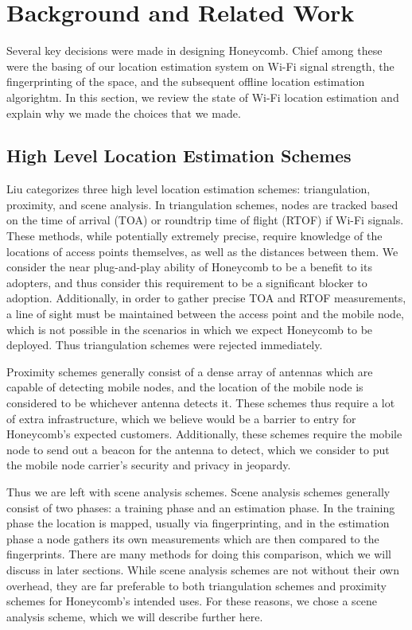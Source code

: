 \chapter{Background and Related Work}
\label{related}
%

Several key decisions were made in designing Honeycomb. Chief among these were the basing of our location estimation system on Wi-Fi signal strength, the fingerprinting of the space, and the subsequent offline location estimation algorightm. In this section, we review the state of Wi-Fi location estimation and explain why we made the choices that we made. 

\section{High Level Location Estimation Schemes}
%

Liu \cite{liu2007survey} categorizes three high level location estimation schemes: triangulation, proximity, and scene analysis. In triangulation schemes, nodes are tracked based on the time of arrival (TOA) or roundtrip time of flight (RTOF) if Wi-Fi signals. These methods, while potentially extremely precise, require knowledge of the locations of access points themselves, as well as the distances between them. We consider the near plug-and-play ability of Honeycomb to be a benefit to its adopters, and thus consider this requirement to be a significant blocker to adoption.  Additionally, in order to gather precise TOA and RTOF measurements, a line of sight must be maintained between the access point and the mobile node, which is not possible in the scenarios in which we expect Honeycomb to be deployed. Thus triangulation schemes were rejected immediately. 

Proximity schemes generally consist of a dense array of antennas which are capable of detecting mobile nodes, and the location of the mobile node is considered to be whichever antenna detects it. These schemes thus require a lot of extra infrastructure, which we believe would be a barrier to entry for Honeycomb's expected customers. Additionally, these schemes require the mobile node to send out a beacon for the antenna to detect, which we consider to put the mobile node carrier's security and privacy in jeopardy. 
	
Thus we are left with scene analysis schemes. Scene analysis schemes generally consist of two phases: a training phase and an estimation phase. In the training phase the location is mapped, usually via fingerprinting, and in the estimation phase a node gathers its own measurements which are then compared to the fingerprints. There are many methods for doing this comparison, which we will discuss in later sections. While scene analysis schemes are not without their own overhead, they are far preferable to both triangulation schemes and proximity schemes for Honeycomb's intended uses. For these reasons, we chose a scene analysis scheme, which we will describe further here.
	

